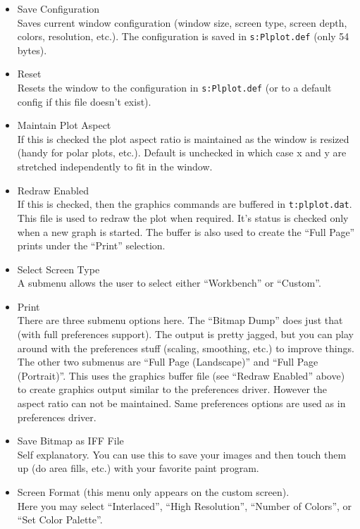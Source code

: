 \begin{itemize}
      \item Save Configuration\\
            Saves current window configuration (window size, screen type,
            screen depth, colors, resolution, etc.). The configuration
            is saved in {\tt s:Plplot.def} (only 54 bytes).

      \item Reset\\
            Resets the window to the configuration in {\tt s:Plplot.def}
            (or to a default config if this file doesn't exist).

      \item Maintain Plot Aspect\\
            If this is checked the plot aspect ratio is maintained as the
            window is resized (handy for polar plots, etc.). Default
            is unchecked in which case x and y are stretched
            independently to fit in the window.

      \item Redraw Enabled\\
            If this is checked, then the graphics commands are buffered
            in {\tt t:plplot.dat}. This file is used to redraw the plot when
            required. It's status is checked only when a new graph is
            started. The buffer is also used to create the ``Full Page''
            prints under the ``Print'' selection.

      \item Select Screen Type\\
            A submenu allows the user to select either ``Workbench'' or
            ``Custom''.

      \item Print\\
            There are three submenu options here. The ``Bitmap Dump''
            does just that (with full preferences support). The
            output is pretty jagged, but you can play around with
            the preferences stuff (scaling, smoothing, etc.) to
            improve things. The other two submenus are
            ``Full Page (Landscape)'' and ``Full Page (Portrait)''. This
            uses the graphics buffer file (see ``Redraw Enabled'' above)
            to create graphics output similar to the preferences
            driver. However the aspect ratio can not be maintained.
            Same preferences options are used as in preferences driver.

      \item Save Bitmap as IFF File\\
            Self explanatory. You can use this to save your images and
            then touch them up (do area fills, etc.) with your favorite
            paint program.

      \item Screen Format (this menu only appears on the custom screen).\\
	    Here you may select ``Interlaced'', ``High Resolution'', 
	    ``Number of Colors'', or ``Set Color Palette''.
\end{itemize}
